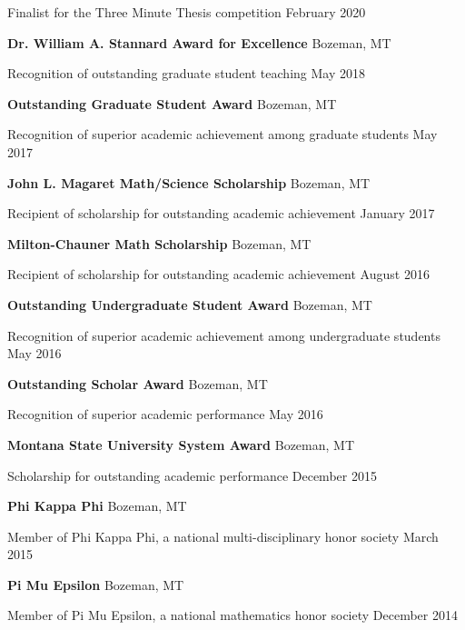 \documentclass[a4paper]{article}
\begin{document}
Finalist for the Three Minute Thesis competition \hfill February 2020

\vspace*{2mm}

\textbf{Dr. William A. Stannard Award for Excellence} \hfill Bozeman, MT

Recognition of outstanding graduate student teaching \hfill May 2018

\vspace*{2mm}

\textbf{Outstanding Graduate Student Award} \hfill Bozeman, MT

Recognition of superior academic achievement among graduate students
\hfill May 2017

\vspace*{2mm}

\textbf{John L. Magaret Math/Science Scholarship} \hfill Bozeman, MT

Recipient of scholarship for outstanding academic achievement
\hfill January 2017

\vspace*{2mm}

\textbf{Milton-Chauner Math Scholarship} \hfill Bozeman, MT

Recipient of scholarship for outstanding academic achievement
\hfill August 2016

\vspace*{2mm}

\textbf{Outstanding Undergraduate Student Award} \hfill Bozeman, MT

Recognition of superior academic achievement among undergraduate
students \hfill May 2016

\vspace*{2mm}

\textbf{Outstanding Scholar Award} \hfill Bozeman, MT

Recognition of superior academic performance \hfill May 2016

\vspace*{2mm}

\textbf{Montana State University System Award} \hfill Bozeman, MT

Scholarship for outstanding academic performance \hfill December 2015

\vspace*{2mm}

\textbf{Phi Kappa Phi} \hfill Bozeman, MT

Member of Phi Kappa Phi, a national multi-disciplinary honor society
\hfill March 2015

\vspace*{2mm}

\textbf{Pi Mu Epsilon} \hfill Bozeman, MT

Member of Pi Mu Epsilon, a national mathematics honor society
\hfill December 2014

\vspace*{2mm}
\end{document}
